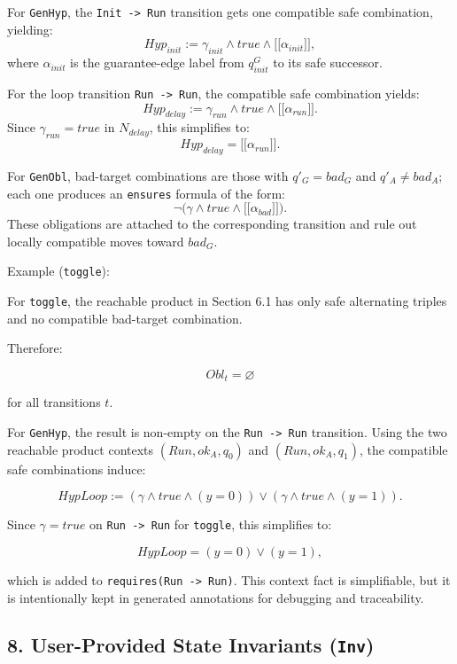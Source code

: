 \documentclass[
]{article}
\providecommand{\llbracket}{\mathopen{[\![}}
\providecommand{\rrbracket}{\mathclose{]\!]}}
\providecommand{\coloneqq}{:=}
\begin{document}
For \texttt{GenHyp}, the \texttt{Init\ -\textgreater{}\ Run} transition
gets one compatible safe combination, yielding: \[
Hyp_{init}\coloneqq \gamma_{init}\land true\land\llbracket\alpha_{init}\rrbracket,
\] where \(\alpha_{init}\) is the guarantee-edge label from
\(q^G_{init}\) to its safe successor.

For the loop transition \texttt{Run\ -\textgreater{}\ Run}, the
compatible safe combination yields: \[
Hyp_{delay}\coloneqq \gamma_{run}\land true\land\llbracket\alpha_{run}\rrbracket.
\] Since \(\gamma_{run}=true\) in \(N_{delay}\), this simplifies to: \[
Hyp_{delay}=\llbracket\alpha_{run}\rrbracket.
\]

For \texttt{GenObl}, bad-target combinations are those with
\(q'_G=bad_G\) and \(q'_A\neq bad_A\); each one produces an
\texttt{ensures} formula of the form: \[
\neg\bigl(\gamma\land true\land\llbracket\alpha_{bad}\rrbracket\bigr).
\] These obligations are attached to the corresponding transition and
rule out locally compatible moves toward \(bad_G\).

Example (\texttt{toggle}):

For \texttt{toggle}, the reachable product in Section 6.1 has only safe
alternating triples and no compatible bad-target combination.

Therefore:

\[
Obl_t=\varnothing
\]

for all transitions \(t\).

For \texttt{GenHyp}, the result is non-empty on the
\texttt{Run\ -\textgreater{}\ Run} transition. Using the two reachable
product contexts \((Run,ok_A,q_0)\) and \((Run,ok_A,q_1)\), the
compatible safe combinations induce:

\[
HypLoop \coloneqq (\gamma\land true\land(y=0)) \lor (\gamma\land true\land(y=1)).
\]

Since \(\gamma=true\) on \texttt{Run\ -\textgreater{}\ Run} for
\texttt{toggle}, this simplifies to:

\[
HypLoop=(y=0)\lor(y=1),
\]

which is added to \texttt{requires(Run\ -\textgreater{}\ Run)}. This
context fact is simplifiable, but it is intentionally kept in generated
annotations for debugging and traceability.

\subsection{\texorpdfstring{8. User-Provided State Invariants
(\texttt{Inv})}{8. User-Provided State Invariants (Inv)}}\label{user-provided-state-invariants-inv}
\end{document}
